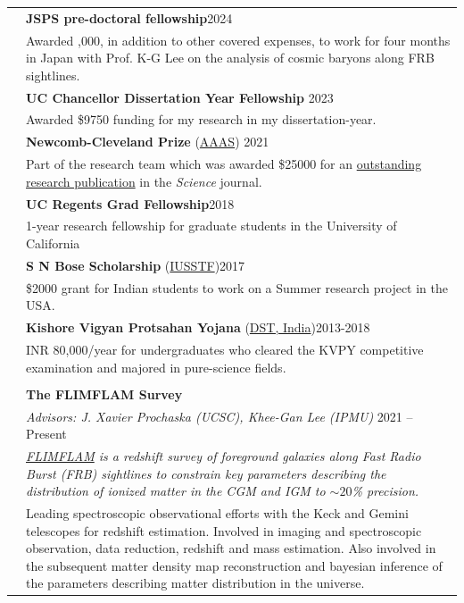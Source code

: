 \documentclass[letterpaper, 11pt]{article}
\begin{document}
\begin{longtable}{p{1.3in}p{4.8in}}
{\color{OliveGreen}{Awards and}}
& \textbf{JSPS pre-doctoral fellowship}\hfill 2024\\
{\color{OliveGreen}{scholarships}}
& Awarded \textyen 200,000, in addition to other covered expenses, to work for four months in Japan with Prof. K-G Lee on the analysis of cosmic baryons along FRB sightlines.\\ 
& \textbf{UC Chancellor Dissertation Year Fellowship} \hfill 2023\\
& Awarded \$9750 funding for my research in my dissertation-year.\\  
& \textbf{Newcomb-Cleveland Prize} (\href{https://www.aaas.org/awards/newcomb-cleveland-prize/about}{AAAS}) \hfill 2021\\
& Part of the research team which was awarded \$25000 for an \href{https://ui.adsabs.harvard.edu/link_gateway/2019Sci...365..565B/doi:10.1126/science.aaw5903}{outstanding research publication} in the \textit{Science} journal.\\ 
& \textbf{UC Regents Grad Fellowship}\hfill2018\\
& 1-year research fellowship for graduate students in the University of California\\
& \textbf{S N Bose Scholarship}  (\href{https://iusstf.org/home}{IUSSTF})\hfill 2017 \\
& \$2000 grant for Indian students to work on a Summer research project in the USA.\\
& \textbf{Kishore Vigyan Protsahan Yojana} (\href{http://kvpy.iisc.ernet.in/main/about.htm}{DST, India})\hfill 2013-2018\\
& INR 80,000/year for undergraduates who cleared the KVPY competitive examination and majored in pure-science fields.\\
\hline
&\\
\nohyphens{\color{OliveGreen}{Research experience}} 
& \textbf{The FLIMFLAM Survey} \\
& \textit{Advisors: J. Xavier Prochaska (UCSC), Khee-Gan Lee (IPMU)} \hfill 2021 -- Present \\
& \textit{\href{https://ui.adsabs.harvard.edu/abs/2022ApJ...928....9L/abstract}{FLIMFLAM} is a redshift survey of foreground galaxies along Fast Radio Burst (FRB) sightlines to constrain key parameters describing the distribution of ionized matter in the CGM and IGM to $\sim20$\% precision. }\\
& Leading spectroscopic observational efforts with the Keck and Gemini telescopes for redshift estimation. Involved in imaging and spectroscopic observation, data reduction, redshift and mass estimation. Also involved in the subsequent matter density map reconstruction and bayesian inference of the parameters describing matter distribution in the universe. \\

\end{longtable}
\end{document}
